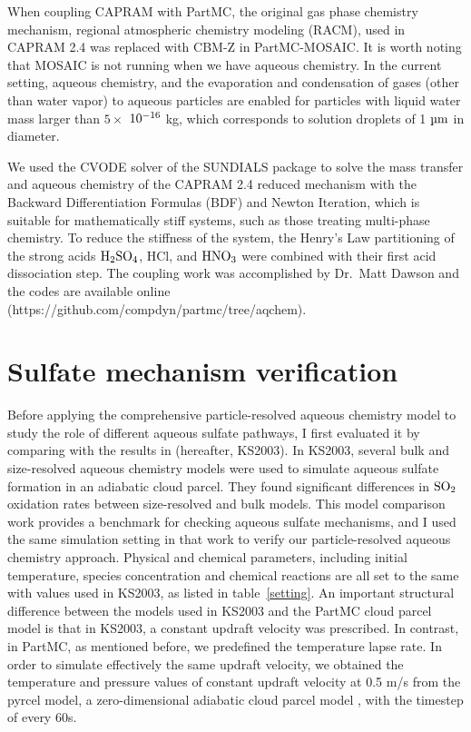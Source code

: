 \documentclass[edeposit,fullpage]{uiucthesis2009}
\begin{document}
When coupling CAPRAM with PartMC, the original gas phase chemistry
mechanism, regional atmospheric chemistry modeling (RACM), used in
CAPRAM 2.4 was replaced with CBM-Z in PartMC-MOSAIC. It is worth
noting that MOSAIC is not running when we have aqueous chemistry. In
the current setting, aqueous chemistry, and the evaporation and
condensation of gases (other than water vapor) to aqueous particles
are enabled for particles with liquid water mass larger than $5\times$
$\rm 10^{-16}$ kg, which corresponds to solution droplets of 1 $\rm
\mu m$ in diameter.

We used the CVODE \cite{Cohen1996} solver of the SUNDIALS
\cite{Hindmarsh2005} package to solve the mass transfer and aqueous
chemistry of the CAPRAM 2.4 reduced mechanism with the Backward
Differentiation Formulas (BDF) and Newton Iteration, which is suitable
for mathematically stiff systems, such as those treating multi-phase
chemistry.  To reduce the stiffness of the system, the Henry's Law
partitioning of the strong acids $\rm H_2SO_4$, HCl, and $\rm HNO_3$
were combined with their first acid dissociation step. The coupling
work was accomplished by Dr.\ Matt Dawson and the codes are available
online (https://github.com/compdyn/partmc/tree/aqchem).

\section{Sulfate mechanism verification}
\label{chap2.3}
Before applying the comprehensive particle-resolved aqueous chemistry
model to study the role of different aqueous sulfate pathways, I first
evaluated it by comparing with the results in
\cite{kreidenweis2003modification} (hereafter, KS2003). In KS2003,
several bulk and size-resolved aqueous chemistry models were used to
simulate aqueous sulfate formation in an adiabatic cloud parcel. They
found significant differences in $\rm SO_2$ oxidation rates between
size-resolved and bulk models. This model comparison work provides a
benchmark for checking aqueous sulfate mechanisms, and I used the same
simulation setting in that work to verify our particle-resolved
aqueous chemistry approach. Physical and chemical parameters,
including initial temperature, species concentration and chemical
reactions are all set to the same with values used in KS2003, as
listed in table~\ref{setting}. An important structural difference
between the models used in KS2003 and the PartMC cloud parcel model is
that in KS2003, a constant updraft velocity was prescribed. In
contrast, in PartMC, as mentioned before, we predefined the
temperature lapse rate. In order to simulate effectively the same
updraft velocity, we obtained the temperature and pressure values of
constant updraft velocity at 0.5 m/s from the pyrcel model, a
zero-dimensional adiabatic cloud parcel model
\citep{rothenberg2016metamodeling}, with the timestep of every 60s.
\end{document}
